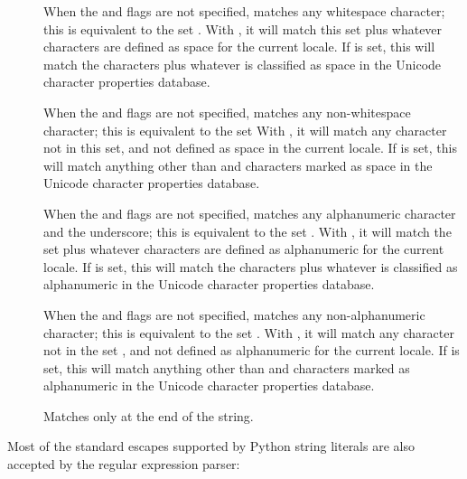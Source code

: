 \begin{description}
\item[]When the  and 
flags are not specified, matches any whitespace character; this is
equivalent to the set \regexp{[ \e t\e n\e r\e f\e v]}.
With , it will match this set plus whatever characters
are defined as space for the current locale. If  is set,
this will match the characters \regexp{[ \e t\e n\e r\e f\e v]} plus
whatever is classified as space in the Unicode character properties
database.

\item[]When the  and 
flags are not specified, matches any non-whitespace character; this is
equivalent to the set \regexp{[\textasciicircum\ \e t\e n\e r\e f\e v]}
With , it will match any character not in this set,
and not defined as space in the current locale. If 
is set, this will match anything other than \regexp{[ \e t\e n\e r\e f\e v]}
and characters marked as space in the Unicode character properties database.

\item[]When the  and 
flags are not specified, matches any alphanumeric character and the
underscore; this is equivalent to the set
\regexp{[a-zA-Z0-9_]}.  With , it will match the set
\regexp{[0-9_]} plus whatever characters are defined as alphanumeric for
the current locale.  If  is set, this will match the
characters \regexp{[0-9_]} plus whatever is classified as alphanumeric
in the Unicode character properties database.

\item[]When the  and 
flags are not specified, matches any non-alphanumeric character; this
is equivalent to the set \regexp{[{\textasciicircum}a-zA-Z0-9_]}.   With
, it will match any character not in the set
\regexp{[0-9_]}, and not defined as alphanumeric for the current locale.
If  is set, this will match anything other than
\regexp{[0-9_]} and characters marked as alphanumeric in the Unicode
character properties database.

\item[]Matches only at the end of the string.

\end{description}

Most of the standard escapes supported by Python string literals are
also accepted by the regular expression parser:

